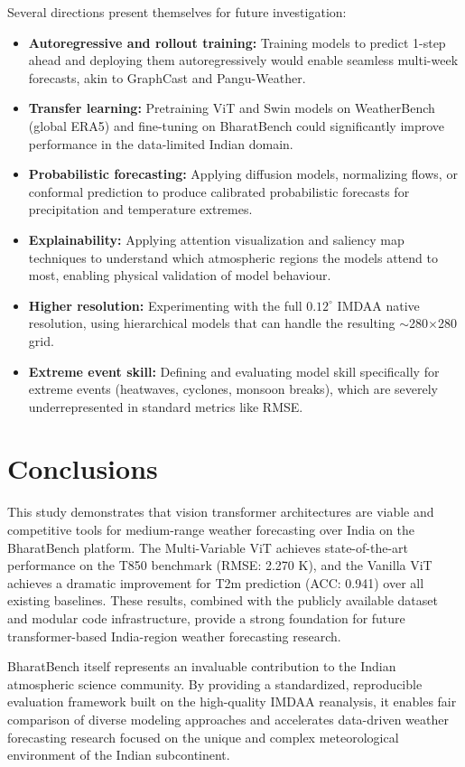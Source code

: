 \documentclass[12pt,a4paper,oneside]{report}
\begin{document}
Several directions present themselves for future investigation:
\begin{itemize}
    \item \textbf{Autoregressive and rollout training:} Training models to predict 1-step ahead and deploying them autoregressively would enable seamless multi-week forecasts, akin to GraphCast and Pangu-Weather.
    \item \textbf{Transfer learning:} Pretraining ViT and Swin models on WeatherBench (global ERA5) and fine-tuning on BharatBench could significantly improve performance in the data-limited Indian domain.
    \item \textbf{Probabilistic forecasting:} Applying diffusion models, normalizing flows, or conformal prediction to produce calibrated probabilistic forecasts for precipitation and temperature extremes.
    \item \textbf{Explainability:} Applying attention visualization and saliency map techniques to understand which atmospheric regions the models attend to most, enabling physical validation of model behaviour.
    \item \textbf{Higher resolution:} Experimenting with the full $0.12^\circ$ IMDAA native resolution, using hierarchical models that can handle the resulting $\sim$280$\times$280 grid.
    \item \textbf{Extreme event skill:} Defining and evaluating model skill specifically for extreme events (heatwaves, cyclones, monsoon breaks), which are severely underrepresented in standard metrics like RMSE.
\end{itemize}

\section{Conclusions}

This study demonstrates that vision transformer architectures are viable and competitive tools for medium-range weather forecasting over India on the BharatBench platform. The Multi-Variable ViT achieves state-of-the-art performance on the T850 benchmark (RMSE: 2.270 K), and the Vanilla ViT achieves a dramatic improvement for T2m prediction (ACC: 0.941) over all existing baselines. These results, combined with the publicly available dataset and modular code infrastructure, provide a strong foundation for future transformer-based India-region weather forecasting research.

BharatBench itself represents an invaluable contribution to the Indian atmospheric science community. By providing a standardized, reproducible evaluation framework built on the high-quality IMDAA reanalysis, it enables fair comparison of diverse modeling approaches and accelerates data-driven weather forecasting research focused on the unique and complex meteorological environment of the Indian subcontinent.
\end{document}
